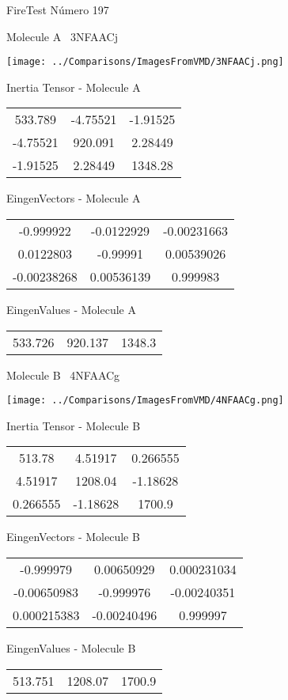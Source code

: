 \vtab[-3cm]
\begin{center}
{\large FireTest \tab Número 197}
\end{center}
\begin{multicols}{2}
\begin{center}

Molecule A \
3NFAACj

\texttt{[image: ../Comparisons/ImagesFromVMD/3NFAACj.png]}

Inertia Tensor - Molecule A \\
\begin{tabular}{|c c c|}
533.789	 & 	-4.75521	 & 	-1.91525	 \\
-4.75521	 & 	920.091	 & 	2.28449	 \\
-1.91525	 & 	2.28449	 & 	1348.28
\end{tabular}

\vtab
 EingenVectors - Molecule A     \\
\begin{tabular}{|c c c|}
-0.999922	 & 	-0.0122929	 & 	-0.00231663	 \\
0.0122803	 & 	-0.99991	 & 	0.00539026	 \\
-0.00238268	 & 	0.00536139	 & 	0.999983
\end{tabular}

\vtab
 EingenValues - Molecule A     \\
\begin{tabular}{|c c c|}
533.726	 & 	920.137	 & 	1348.3	 \\
\end{tabular}
\columnbreak

Molecule B \
4NFAACg

\texttt{[image: ../Comparisons/ImagesFromVMD/4NFAACg.png]}

Inertia Tensor - Molecule B \\
\begin{tabular}{|c c c|}
513.78	 & 	4.51917	 & 	0.266555	 \\
4.51917	 & 	1208.04	 & 	-1.18628	 \\
0.266555	 & 	-1.18628	 & 	1700.9
\end{tabular}

\vtab
 EingenVectors - Molecule B     \\
\begin{tabular}{|c c c|}
-0.999979	 & 	0.00650929	 & 	0.000231034	 \\
-0.00650983	 & 	-0.999976	 & 	-0.00240351	 \\
0.000215383	 & 	-0.00240496	 & 	0.999997
\end{tabular}

\vtab
 EingenValues - Molecule B     \\
\begin{tabular}{|c c c|}
513.751	 & 	1208.07	 & 	1700.9	 \\
\end{tabular}

\end{center}
\end{multicols}

